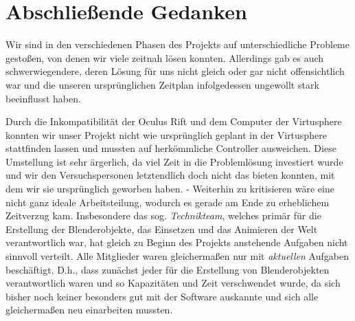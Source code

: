 \documentclass{Bericht}
\begin{document}

\section{Abschließende Gedanken} %
	Wir sind in den verschiedenen Phasen des Projekts auf unterschiedliche Probleme gestoßen, von denen wir viele zeitnah lösen konnten. Allerdings gab es auch schwerwiegendere, deren Lösung für uns nicht gleich oder gar nicht offensichtlich war und die unseren ursprünglichen Zeitplan infolgedessen ungewollt stark beeinflusst haben.

	Durch die Inkompatibilität der Oculus Rift und dem Computer der Virtusphere konnten wir unser Projekt nicht wie ursprünglich geplant in der Virtusphere stattfinden lassen und mussten auf herkömmliche Controller ausweichen. Diese Umstellung ist sehr ärgerlich, da viel Zeit in die Problemlösung investiert wurde und wir den Versuchspersonen letztendlich doch nicht das bieten konnten, mit dem wir sie ursprünglich geworben haben. 
 -	Weiterhin zu kritisieren wäre eine nicht ganz ideale Arbeitsteilung, wodurch es gerade am Ende zu erheblichem Zeitverzug kam. Insbesondere das sog. \textit{Technikteam}, welches primär für die Erstellung der Blenderobjekte, das Einsetzen und das Animieren der Welt verantwortlich war, hat gleich zu Beginn des Projekts anstehende Aufgaben nicht sinnvoll verteilt. Alle Mitglieder waren gleichermaßen nur mit \textit{aktuellen} Aufgaben beschäftigt. D.h., dass zunächst jeder für die Erstellung von Blenderobjekten verantwortlich waren und so Kapazitäten und Zeit verschwendet wurde, da sich bisher noch keiner besonders gut mit der Software auskannte und sich alle gleichermaßen neu einarbeiten mussten.
 
\end{document}
